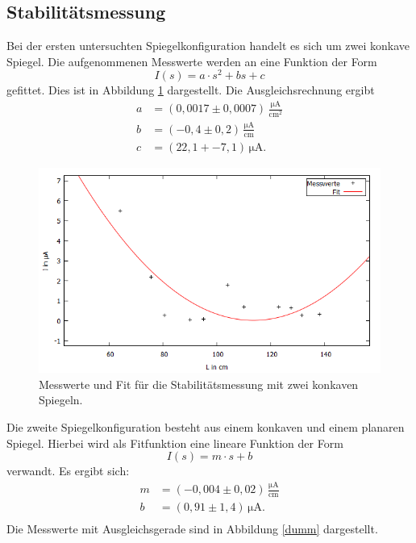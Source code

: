 \subsection{Stabilitätsmessung}
Bei der ersten untersuchten Spiegelkonfiguration handelt es sich um zwei konkave Spiegel. Die aufgenommenen Messwerte werden an eine Funktion der Form
\begin{equation}
  I(s)=a\cdot s^2+bs+c
\end{equation}
gefittet. Dies ist in Abbildung \ref{stabfit1} dargestellt. Die Ausgleichsrechnung ergibt
\begin{align*}
 a &=(0,0017 \pm 0,0007)\, \frac{\si{\micro\ampere}}{\si{\centi\meter}^2}\\
 b &=(-0,4 \pm 0,2)\,  \frac{\si{\micro\ampere}}{\si{\centi\meter}}\\
  c &=(22,1+- 7,1)\,  \si{\micro\ampere}.
\end{align*}
\begin{figure}[H]
  \centering
  \includegraphics[width=14cm]{bilder/konkavkonkav.png}
  \caption{Messwerte und Fit für die Stabilitätsmessung mit zwei konkaven Spiegeln.}
  \label{stabfit1}
\end{figure}
Die zweite Spiegelkonfiguration besteht aus einem konkaven und einem planaren Spiegel. Hierbei wird als Fitfunktion eine lineare Funktion der Form
\begin{equation}
  I(s)=m\cdot s+b
\end{equation}
verwandt. Es ergibt sich:
\begin{align*}
  m &=(-0,004 \pm 0,02)\,  \frac{\si{\micro\ampere}}{\si{\centi\meter}}\\
  b &=(0,91 \pm 1,4)\,\si{\micro\ampere}.\\
\end{align*}
Die Messwerte mit Ausgleichsgerade sind in Abbildung \ref{dumm} dargestellt.
